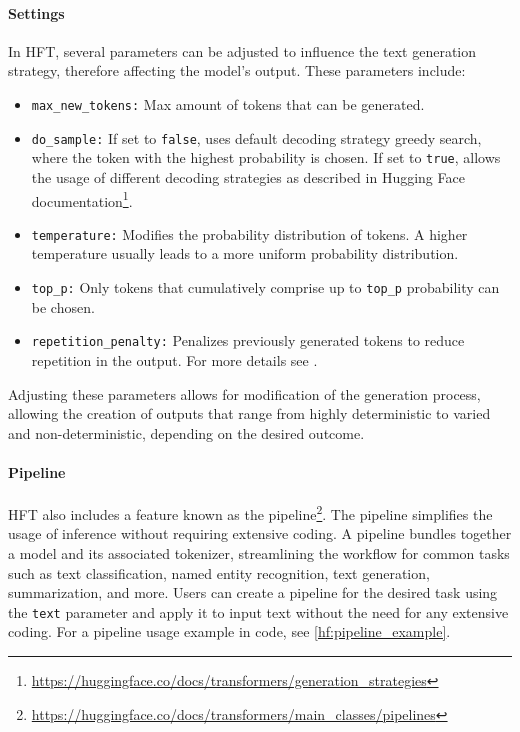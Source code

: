 \documentclass[english, ba, kiv, he, iso690numb, pdf, viewonly]{fasthesis}
\begin{document}
\paragraph{Settings}\label{impl:hf:inference_settings}
In HFT, several parameters can be adjusted to influence the text generation strategy, therefore affecting the model's output. These parameters include:
\begin{itemize}
    \item \texttt{max\_new\_tokens:} Max amount of tokens that can be generated.
    \item \texttt{do\_sample:} If set to \texttt{false}, uses default decoding strategy greedy search, where the token with the highest probability is chosen. If set to \texttt{true}, allows the usage of different decoding strategies as described in Hugging Face documentation\footnote{\url{https://huggingface.co/docs/transformers/generation_strategies}}.
    \item \texttt{temperature:} Modifies the probability distribution of tokens. A higher temperature usually leads to a more uniform probability distribution.
    \item \texttt{top\_p:} Only tokens that cumulatively comprise up to \texttt{top\_p} probability can be chosen.
    \item \texttt{repetition\_penalty:} Penalizes previously generated tokens to reduce repetition in the output. For more details see \cite{keskar2019ctrl}.
\end{itemize}
Adjusting these parameters allows for modification of the generation process, allowing the creation of outputs that range from highly deterministic to varied and non-deterministic, depending on the desired outcome.

\paragraph{Pipeline} \label{hf:pipeline}
HFT also includes a feature known as the pipeline\footnote{\url{https://huggingface.co/docs/transformers/main_classes/pipelines}}. The pipeline simplifies the usage of inference without requiring extensive coding. A pipeline bundles together a model and its associated tokenizer, streamlining the workflow for common tasks such as text classification, named entity recognition, text generation, summarization, and more. Users can create a pipeline for the desired task using the \texttt{text} parameter and apply it to input text without the need for any extensive coding. For a pipeline usage example in code, see \ref{hf:pipeline_example}.
\end{document}
